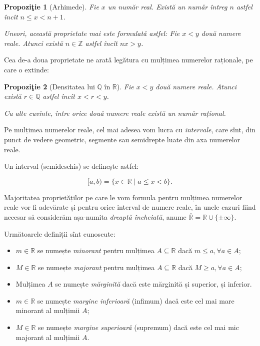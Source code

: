 \documentclass[11pt,a4paper]{article}
\newcommand\seq{\subseteq}
\newcommand\RR{\mathbb{R}}
\newcommand\ZZ{\mathbb{Z}}
\newcommand\QQ{\mathbb{Q}}
\theoremstyle{dotless}
\newtheorem{proposition}{Propozi\c{t}ie}[section]
\theoremstyle{dotlessdr}
\begin{document}
\begin{proposition}[Arhimede]\label{prop:arhimede}
  Fie $x$ un număr real. Există un număr întreg $n$ astfel încît $n \leq x < n+1$.

  Uneori, această proprietate mai este formulată astfel:
  Fie $x < y$ două numere reale. Atunci există $n \in \ZZ$ astfel încît $nx > y$.
\end{proposition}

Cea de-a doua proprietate ne arată legătura cu mulțimea numerelor raționale, pe care
o extinde:

\begin{proposition}[Densitatea lui $\QQ$ în $\RR$]\label{prop:dens-q}
  Fie $x < y$ două numere reale. Atunci există $r \in \QQ$ astfel încît $x < r < y$.

  Cu alte cuvinte, între orice două numere reale există un număr rațional.
\end{proposition}

Pe mulțimea numerelor reale, cel mai adesea vom lucra cu \emph{intervale},
care sînt, din punct de vedere geometric, segmente sau semidrepte luate
din axa numerelor reale.

Un interval (semideschis) se definește astfel:

\[
  [a, b) = \{ x \in \RR \mid a \leq x < b \}.
\]

Majoritatea proprietăților pe care le vom formula pentru mulțimea numerelor
reale vor fi adevărate și pentru orice interval de numere reale, în unele
cazuri fiind necesar să considerăm așa-numita \emph{dreaptă încheiată},
anume $\overline{\RR} = \RR \cup \{ \pm \infty \}$.

Următoarele definiții sînt cunoscute:

\begin{itemize}
  \item $m \in \RR$ se numește \emph{minorant} pentru 
    mulțimea $A \seq \RR$ dacă $m \leq a, \forall a \in A$;
  \item $M \in \RR$ se numește \emph{majorant}  pentru 
    mulțimea $A \seq \RR$ dacă $M \geq a, \forall a \in A$;
  \item Mulțimea $A$ se numește \emph{mărginită} dacă este mărginită și superior,
    și inferior.
  \item $m \in \RR$ se numește \emph{margine inferioară} (infimum) dacă este
    cel mai mare minorant al mulțimii $A$;
  \item $M \in \RR$ se numește \emph{margine superioară} (supremum) dacă este cel
    mai mic majorant al mulțimii $A$.
\end{itemize}
\end{document}
